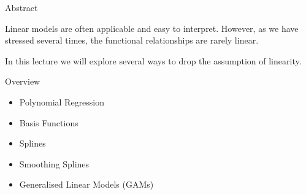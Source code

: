 \documentclass[mathserif, aspectratio=169]{beamer}
\subtitle{\bfseries%
  {Beyond Linearity}\\%
  {\tiny\it Plynomial Regression, Basis Functions, Splines, Generalised Additive Models}\\%
}
\begin{document}


\begin{frame}{Abstract}
	\begin{blurb}
		Linear models are often applicable and easy to interpret. However, as
		we have stressed several times, the  functional relationships
		are rarely linear.

		In this lecture we will explore several ways to drop the assumption
		of linearity.
	\end{blurb}
\end{frame}

\begin{frame}{Overview}
	\begin{itemize}
		\item Polynomial Regression
		\item Basis Functions
		\item Splines
		\item Smoothing Splines
		\item Generalised Linear Models (GAMs)
	\end{itemize}
\end{frame}
\end{document}
